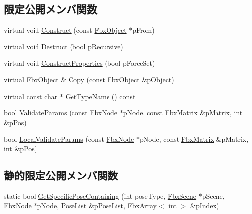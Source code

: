 \subsection*{限定公開メンバ関数}
\begin{DoxyCompactItemize}
\item 
virtual void \hyperlink{class_fbx_pose_abd6c67a88377309bc406151e70e30219}{Construct} (const \hyperlink{class_fbx_object}{Fbx\+Object} $\ast$p\+From)
\item 
virtual void \hyperlink{class_fbx_pose_a9c7e0d61d4d7cbec51a01352e25678d5}{Destruct} (bool p\+Recursive)
\item 
virtual void \hyperlink{class_fbx_pose_a56784b0847fb1e83c02afe991c40581a}{Construct\+Properties} (bool p\+Force\+Set)
\item 
virtual \hyperlink{class_fbx_object}{Fbx\+Object} \& \hyperlink{class_fbx_pose_a5fa5e19c330ff196bc7e8cdd152c223f}{Copy} (const \hyperlink{class_fbx_object}{Fbx\+Object} \&p\+Object)
\item 
virtual const char $\ast$ \hyperlink{class_fbx_pose_ade93c02bcfa5b5694a6945175387d285}{Get\+Type\+Name} () const
\item 
bool \hyperlink{class_fbx_pose_ae776ba435dfd811a0c720365bcb94682}{Validate\+Params} (const \hyperlink{class_fbx_node}{Fbx\+Node} $\ast$p\+Node, const \hyperlink{class_fbx_matrix}{Fbx\+Matrix} \&p\+Matrix, int \&p\+Pos)
\item 
bool \hyperlink{class_fbx_pose_a5626f7fcf247027260044e616ffbb106}{Local\+Validate\+Params} (const \hyperlink{class_fbx_node}{Fbx\+Node} $\ast$p\+Node, const \hyperlink{class_fbx_matrix}{Fbx\+Matrix} \&p\+Matrix, int \&p\+Pos)
\end{DoxyCompactItemize}
\subsection*{静的限定公開メンバ関数}
\begin{DoxyCompactItemize}
\item 
static bool \hyperlink{class_fbx_pose_a1615d6d70d2f1ca10a585061c671dce6}{Get\+Specific\+Pose\+Containing} (int pose\+Type, \hyperlink{class_fbx_scene}{Fbx\+Scene} $\ast$p\+Scene, \hyperlink{class_fbx_node}{Fbx\+Node} $\ast$p\+Node, \hyperlink{fbxpose_8h_ad68863a9c2ab60c2210bb3dff02a680a}{Pose\+List} \&p\+Pose\+List, \hyperlink{class_fbx_array}{Fbx\+Array}$<$ int $>$ \&p\+Index)
\end{DoxyCompactItemize}
